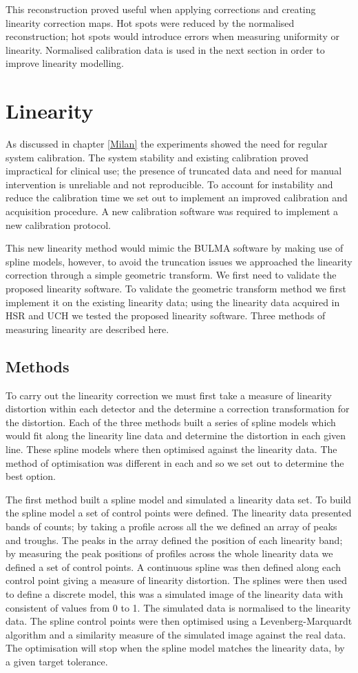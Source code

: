 This reconstruction proved useful when applying corrections and creating linearity correction maps. Hot spots were reduced by the normalised reconstruction; hot spots would introduce errors when measuring uniformity or linearity. Normalised calibration data is used in the next section in order to improve linearity modelling.

\section{Linearity}
As discussed in chapter \ref{Milan} the experiments showed the need for regular system calibration. The system stability and existing calibration proved impractical for clinical use; the presence of truncated data and need for manual intervention is unreliable and not reproducible. To account for instability and reduce the calibration time we set out to implement an improved calibration and acquisition procedure. A new calibration software was required to implement a new calibration protocol.

This new linearity method would mimic the BULMA software by making use of spline models, however, to avoid the truncation issues we approached the linearity correction through a simple geometric transform. We first need to validate the proposed linearity software. To validate the geometric transform method we first implement it on the existing linearity data; using the linearity data acquired in \acrshort{HSR} and \acrshort{UCH} we tested the proposed linearity software. Three methods of measuring linearity are described here. 
\subsection{Methods}
To carry out the linearity correction we must first take a measure of linearity distortion within each detector and the determine a correction transformation for the distortion. Each of the three methods built a series of spline models which would fit along the linearity line data and determine the distortion in each given line. These spline models where then optimised against the linearity data. The method of optimisation was different in each and so we set out to determine the best option. 

The first method built a spline model and simulated a linearity data set. To build the spline model a set of control points were defined. The linearity data presented bands of counts; by taking a profile across all the we defined an array of peaks and troughs. The peaks in the array defined the position of each linearity band; by measuring the peak positions of profiles across the whole linearity data we defined a set of control points. A continuous spline was then defined along each control point giving a measure of linearity distortion. The splines were then used to define a discrete model, this was a simulated image of the linearity data with consistent of values from 0 to 1. The simulated data is normalised to the linearity data. The spline control points were then optimised using a Levenberg-Marquardt algorithm and a similarity measure of the simulated image against the real data. The optimisation will stop when the spline model matches the linearity data, by a given target tolerance. 

